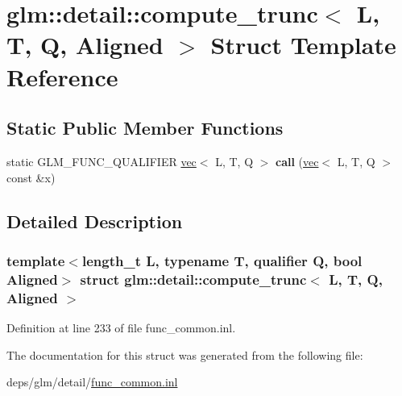\hypertarget{structglm_1_1detail_1_1compute__trunc}{}\section{glm\+:\+:detail\+:\+:compute\+\_\+trunc$<$ L, T, Q, Aligned $>$ Struct Template Reference}
\label{structglm_1_1detail_1_1compute__trunc}
\subsection*{Static Public Member Functions}
\begin{DoxyCompactItemize}
\item 
\mbox{\label{structglm_1_1detail_1_1compute__trunc_a6e3185641ef24c593f34dc6c11f46ca6}} 
static G\+L\+M\+\_\+\+F\+U\+N\+C\+\_\+\+Q\+U\+A\+L\+I\+F\+I\+ER \hyperlink{structglm_1_1vec}{vec}$<$ L, T, Q $>$ {\bfseries call} (\hyperlink{structglm_1_1vec}{vec}$<$ L, T, Q $>$ const \&x)
\end{DoxyCompactItemize}


\subsection{Detailed Description}
\subsubsection*{template$<$length\+\_\+t L, typename T, qualifier Q, bool Aligned$>$\newline
struct glm\+::detail\+::compute\+\_\+trunc$<$ L, T, Q, Aligned $>$}



Definition at line 233 of file func\+\_\+common.\+inl.



The documentation for this struct was generated from the following file\+:\begin{DoxyCompactItemize}
\item 
deps/glm/detail/\hyperlink{func__common_8inl}{func\+\_\+common.\+inl}\end{DoxyCompactItemize}
